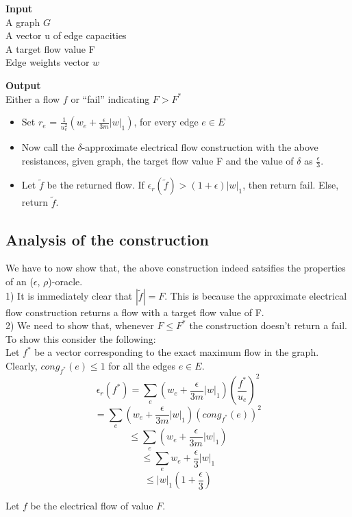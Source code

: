 \documentclass[a4paper,10pt]{article}
\newcommand{\eps}{\epsilon}
\begin{document}
		\textbf{Input} \\
	      A graph $G$ \\
	      A vector u of edge capacities \\
	      A target flow value F \\
	      Edge weights vector $w$
	      
	      \textbf{Output}\\
	      Either a flow $f$ or ``fail'' indicating $F > F^{\ast}$ \\
	      
	      \begin{itemize}
	       \item 
		  Set $r_e$ = $\frac{1}{u_e^2}\left(w_e + \frac{\eps}{3m}|w|_1\right)$, for every edge $e \in E$
		\item	
		  Now call the $\delta$-approximate electrical flow construction with the above resistances, given graph, the target flow value F
		  and the value of $\delta$ as $\frac{\eps}{3}$.
		\item
		  Let $\widetilde{f}$ be the returned flow. If $\eps_r(\widetilde{f}) > (1+\eps)|w|_1$, then return fail.
		  Else, return $\widetilde{f}$.
	      \end{itemize}

	\subsection{Analysis of the construction}
	  We have to now show that, the above construction indeed satsifies the properties of an ($\eps$, $\rho$)-oracle. \\
	  
	  1) It is immediately clear that $|\widetilde{f}| = F$. This is because the approximate electrical flow construction returns a flow with
	  a target flow value of F. \\
	  
	  2) We need to show that, whenever $F \leq F^{\ast}$ the construction doesn't return a fail. To show this consider the following: \\
	  
	    Let $f^{\ast}$ be a vector corresponding to the exact maximum flow in the graph. Clearly, $cong_{f^{\ast}}(e) \leq 1$ for all the edges $e \in E$.
	    $$\eps_r(f^{\ast}) = \sum\limits_e \left(w_e + \frac{\eps}{3m}|w|_1\right)\left( \frac{f^{\ast}}{u_e} \right)^2$$
	    $$= \sum\limits_e \left(w_e + \frac{\eps}{3m}|w|_1\right)\left( cong_{f^{\ast}}(e) \right)^2$$
	    $$\leq \sum\limits_e \left(w_e + \frac{\eps}{3m}|w|_1\right)$$
	    $$\leq \sum\limits_e w_e + \frac{\eps}{3}|w|_1$$
	    $$\leq |w|_1 \left(1 + \frac{\eps}{3} \right)$$
	  
	  Let $f$ be the electrical flow of value $F$. 
	      
\end{document}
